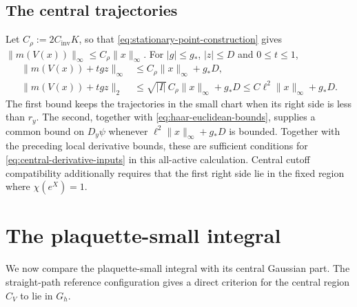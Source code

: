 \documentclass[10pt,reqno]{amsart}
\theoremstyle{definition}
\theoremstyle{remark}
\numberwithin{equation}{section}
\numberwithin{figure}{section}
\begin{document}
\subsection{The central trajectories}
Let $C_\rho:=2C_{\mathrm{inv}}K$, so that
\eqref{eq:stationary-point-construction} gives
$\|m(V(x))\|_\infty\le C_\rho\|x\|_\infty$. For
$|g|\le g_*$, $|z|\le D$ and $0\le t\le1$,
\begin{equation}\label{eq:central-trajectory-two-norms}
\begin{aligned}
\|m(V(x))+tgz\|_\infty
&\le C_\rho\|x\|_\infty+g_*D,\\
\|m(V(x))+tgz\|_2
&\le\sqrt{|I|}\,C_\rho\|x\|_\infty+g_*D
\le C\ell^2\|x\|_\infty+g_*D.
\end{aligned}
\end{equation}
The first bound keeps the trajectories in the small chart when its
right side is less than $r_y$. The second, together with
\eqref{eq:haar-euclidean-bounds}, supplies a common bound on
$D_y\psi$ whenever $\ell^2\|x\|_\infty+g_*D$ is bounded.
Together with the preceding local derivative bounds, these are
sufficient conditions for \eqref{eq:central-derivative-inputs} in this
all-active calculation. Central cutoff compatibility additionally
requires that the first right side lie in the fixed region where
$\chi(e^X)=1$.


\section{The plaquette-small integral}\label{sec:plaquette-small-integral}
We now compare the plaquette-small integral with its central Gaussian
part. The straight-path reference configuration gives a direct
criterion for the central region $C_V$ to lie in $G_h$.
\end{document}
